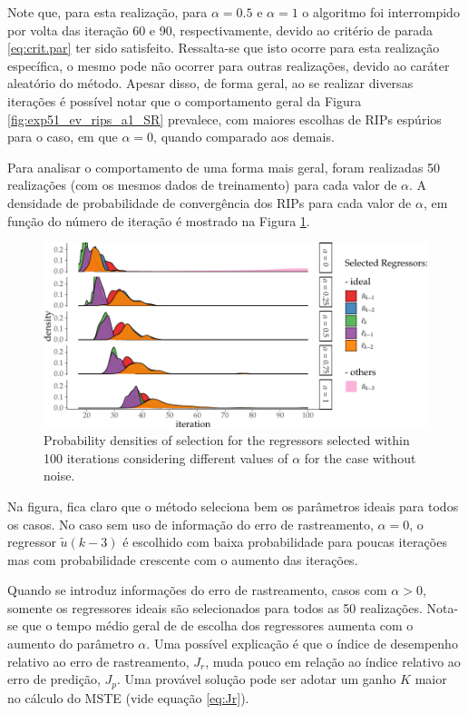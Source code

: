 \begin{exmp}
Note que, para esta realização, para $\alpha=0.5$ e $\alpha=1$ o algoritmo foi interrompido por volta das iteração 60 e 90, respectivamente, devido ao critério de parada \eqref{eq:crit.par} ter sido satisfeito. Ressalta-se que isto ocorre para esta realização específica, o mesmo pode não ocorrer para outras realizações, devido ao caráter aleatório do método.
Apesar disso, de forma geral, ao se realizar diversas iterações é possível notar que o comportamento geral da Figura \ref{fig:exp51_ev_rips_a1_SR} prevalece, com maiores escolhas de RIPs espúrios para o caso, em que $\alpha=0$, quando comparado aos demais.

Para analisar o comportamento de uma forma mais geral, foram realizadas 50 realizações (com os mesmos dados de treinamento) para cada valor de $\alpha$. A densidade de probabilidade de convergência dos RIPs para cada valor de $\alpha$, em função do número de iteração é mostrado na Figura \ref{fig:exp51_dens_prob_SR}.
\begin{figure}[htpb]
  \centering
  \includegraphics{Figs/Cap5/ex51_iter_con_SEM_ruido.tex.pdf}
  \caption{Probability densities of selection for the regressors selected within 100 iterations considering different values of $\alpha$ for the case without noise.}
  \label{fig:exp51_dens_prob_SR}
\end{figure}
Na figura, fica claro que o método seleciona bem os parâmetros ideais para todos os casos. No caso sem uso de informação do erro de rastreamento, $\alpha=0$, o regressor $\tilde{u}(k-3)$ é escolhido com baixa probabilidade para poucas iterações mas com probabilidade crescente com o aumento das iterações. 

Quando se introduz informações do erro de rastreamento, casos com $\alpha>0$, somente os regressores ideais são selecionados para todos as 50 realizações. Nota-se que o tempo médio geral de de escolha dos regressores aumenta com o aumento do parâmetro $\alpha$. Uma possível explicação é que o índice de desempenho relativo ao erro de rastreamento, $J_r$, muda pouco em relação ao índice relativo ao erro de predição, $J_p$. Uma provável solução pode ser adotar um ganho $K$ maior no cálculo do MSTE (vide equação \ref{eq:Jr}).


\end{exmp}
